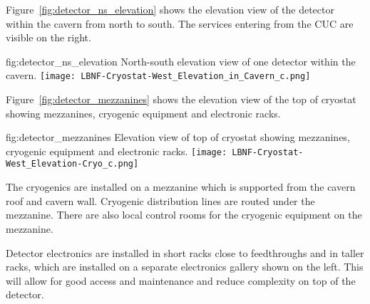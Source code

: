 Figure~\ref{fig:detector_ns_elevation} shows the elevation view of the
detector within the cavern from north to south. The services entering
from the CUC are visible on the right.
\begin{dunefigure}{fig:detector_ns_elevation}
  {North-south elevation view of one detector within the cavern.}
  \texttt{[image: LBNF-Cryostat-West\_Elevation\_in\_Cavern\_c.png]}
\end{dunefigure}

Figure~\ref{fig:detector_mezzanines} shows the elevation view of the
top of cryostat showing mezzanines, cryogenic equipment and electronic
racks.
\begin{dunefigure}{fig:detector_mezzanines}
  {Elevation view of top of cryostat showing mezzanines, cryogenic
    equipment and electronic racks.}
  \texttt{[image: LBNF-Cryostat-West\_Elevation-Cryo\_c.png]}
\end{dunefigure}
The cryogenics are installed on a mezzanine which is supported from
the cavern roof and cavern wall. Cryogenic distribution lines are
routed under the mezzanine. There are also local control rooms for the
cryogenic equipment on the mezzanine.

Detector electronics are installed in short racks close to
feedthroughs and in taller racks, which are installed on a separate
electronics gallery shown on the left. This will allow for good access
and maintenance and reduce complexity on top of the detector.
